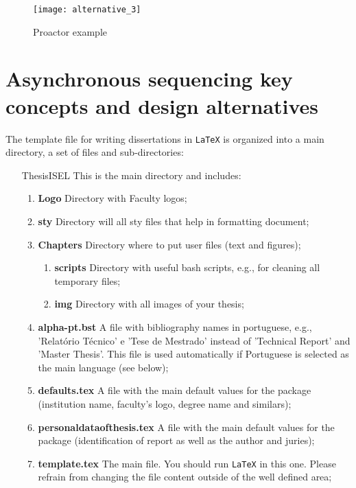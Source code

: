 \begin{figure}[ht]
	\centering
	\texttt{[image: alternative\_3]}
	  \caption{Proactor example}
  \label{fig:bibtex}
\end{figure}


\section{Asynchronous sequencing key concepts and design alternatives} %
\label{sec:async_concepts}

The template file for writing dissertations in  \texttt{LaTeX} is organized into a main directory, a set of files and sub-directories:
\begin{enumerate}
	\item[ThesisISEL] This is the main directory and includes:
	\begin{enumerate}
		\item \textbf{Logo} Directory with Faculty logos;
		\item \textbf{sty} Directory will all sty files that help in formatting document;
		\item \textbf{Chapters} Directory where to put user files (text and figures);
		\begin{enumerate}
		\item \textbf{scripts} Directory with useful bash scripts, e.g., for cleaning all temporary files;
		\item \textbf{img} Directory with all images of your thesis;
		\end{enumerate}
		\item \textbf{alpha-pt.bst} A file with bibliography names in portuguese, e.g., 'Relatório Técnico' e 'Tese de Mestrado' instead of 'Technical Report' and 'Master Thesis'. This file is used automatically if Portuguese is selected as the main language (see below);
		\item \textbf{defaults.tex} A file with the main default values for the package (institution name, faculty's logo, degree name and similars);
		\item \textbf{personaldataofthesis.tex} A file with the main default values for the package (identification of report as well as the author and juries);
		\item \textbf{template.tex} The main file. You should run  \texttt{LaTeX} in this one. Please refrain from changing the file content outside of the well defined area;

\end{enumerate}
\end{enumerate}
